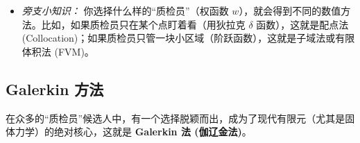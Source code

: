 \documentclass[11pt, a4paper, UTF8]{ctexart}
\begin{document}
\begin{itemize}
    你可能会问：在数学和代码上，到底是用什么机制，硬生生地把一个函数“裁剪”到只在一小块区域有值的？答案就在于\textbf{网格划分 (Meshing)} 与 \textbf{分段多项式 (Piecewise Polynomials)}。
    \begin{itemize}
        \item \textbf{数学上的“帽子函数”：} 我们人为构造了一种极其特殊的分段函数（有限元中称为形函数 $N_i$）。以一维为例，质检员 $w_i$（对应节点 $i$）的权函数就像一个搭在节点上的“尖顶小帐篷”：在自己脚下节点处值为 1，向两侧相邻节点线性衰减到 0，\textbf{而在帐篷以外的所有区域，强行规定其值严格为 0！} 出了帐篷，任何误差乘上 0 还是 0，质检员自然就“看不见”了。这在数学上叫作“紧支集 (Compact Support)”。
        \item \textbf{代码实现的反向思维：} 在写代码时，我们不可能写 1000 个复杂的 \texttt{if-else} 来判断当前坐标是否在某个帐篷里。有限元的程序设计采用了极其巧妙的\textbf{以单元（Element）为中心}的视角。代码的本质是一个外层循环（\texttt{for elem in elements:}）。当程序进入某一个具体的单元时，它只在内部激活与该单元相连的少数几个局部节点的权函数；对于全局中其他所有遥远的权函数，程序逻辑天然认为它们在这个单元内的值为 0，根本不让它们参与当前单元的积分计算。算完这个局部小矩阵后，再根据节点编号将其像贴瓷砖一样“组装 (Assembly)”到全局大矩阵中。
    \end{itemize}

    \item \textit{旁支小知识：} 你选择什么样的“质检员”（权函数 $w$），就会得到不同的数值方法。比如，如果质检员只在某个点盯着看（用狄拉克 $\delta$ 函数），这就是配点法 (Collocation)；如果质检员只管一块小区域（阶跃函数），这就是子域法或有限体积法 (FVM)。
\end{itemize}

\subsection{Galerkin 方法}
在众多的“质检员”候选人中，有一个选择脱颖而出，成为了现代有限元（尤其是固体力学）的绝对核心，这就是 \textbf{Galerkin 法 (伽辽金法)}。
\end{document}
